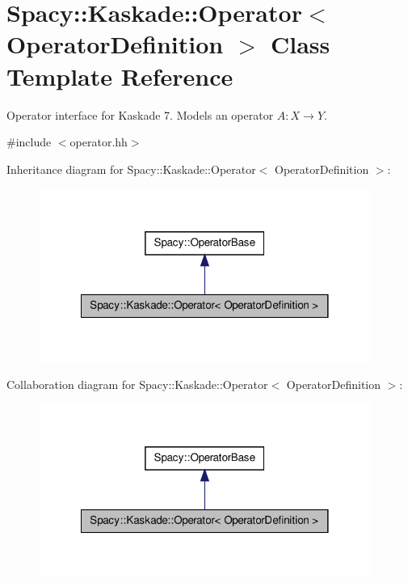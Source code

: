 \hypertarget{classSpacy_1_1Kaskade_1_1Operator}{\section{\-Spacy\-:\-:\-Kaskade\-:\-:\-Operator$<$ \-Operator\-Definition $>$ \-Class \-Template \-Reference}
\label{classSpacy_1_1Kaskade_1_1Operator}
}


\-Operator interface for \-Kaskade 7. \-Models an operator $A:X\rightarrow Y$.  




{\ttfamily \#include $<$operator.\-hh$>$}



\-Inheritance diagram for \-Spacy\-:\-:\-Kaskade\-:\-:\-Operator$<$ \-Operator\-Definition $>$\-:
\nopagebreak
\begin{figure}[H]
\begin{center}
\leavevmode
\includegraphics[width=308pt]{classSpacy_1_1Kaskade_1_1Operator__inherit__graph}
\end{center}
\end{figure}


\-Collaboration diagram for \-Spacy\-:\-:\-Kaskade\-:\-:\-Operator$<$ \-Operator\-Definition $>$\-:
\nopagebreak
\begin{figure}[H]
\begin{center}
\leavevmode
\includegraphics[width=308pt]{classSpacy_1_1Kaskade_1_1Operator__coll__graph}
\end{center}
\end{figure}
